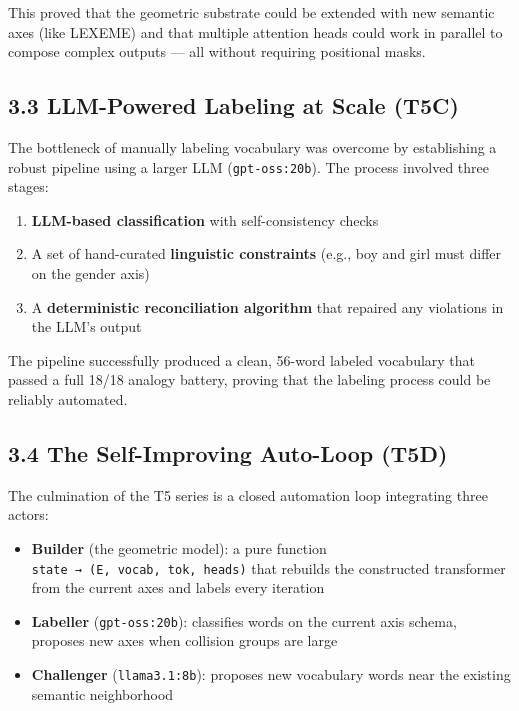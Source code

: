 \documentclass[
  twocolumn,
  10pt,
  a4paper]{article}
\providecommand{\tightlist}{%
  \setlength{\itemsep}{0pt}\setlength{\parskip}{0pt}}
\begin{document}
This proved that the geometric substrate could be extended with new
semantic axes (like LEXEME) and that multiple attention heads could work
in parallel to compose complex outputs --- all without requiring
positional masks.

\hypertarget{llm-powered-labeling-at-scale-t5c}{%
\subsection{3.3 LLM-Powered Labeling at Scale
(T5C)}\label{llm-powered-labeling-at-scale-t5c}}

The bottleneck of manually labeling vocabulary was overcome by
establishing a robust pipeline using a larger LLM
(\texttt{gpt-oss:20b}). The process involved three stages:

\begin{enumerate}
\def\labelenumi{\arabic{enumi}.}
\tightlist
\item
  \textbf{LLM-based classification} with self-consistency checks
\item
  A set of hand-curated \textbf{linguistic constraints} (e.g., boy and
  girl must differ on the gender axis)
\item
  A \textbf{deterministic reconciliation algorithm} that repaired any
  violations in the LLM's output
\end{enumerate}

The pipeline successfully produced a clean, 56-word labeled vocabulary
that passed a full 18/18 analogy battery, proving that the labeling
process could be reliably automated.

\hypertarget{the-self-improving-auto-loop-t5d}{%
\subsection{3.4 The Self-Improving Auto-Loop
(T5D)}\label{the-self-improving-auto-loop-t5d}}

The culmination of the T5 series is a closed automation loop integrating
three actors:

\begin{itemize}
\tightlist
\item
  \textbf{Builder} (the geometric model): a pure function
  \texttt{state\ →\ (E,\ vocab,\ tok,\ heads)} that rebuilds the
  constructed transformer from the current axes and labels every
  iteration
\item
  \textbf{Labeller} (\texttt{gpt-oss:20b}): classifies words on the
  current axis schema, proposes new axes when collision groups are large
\item
  \textbf{Challenger} (\texttt{llama3.1:8b}): proposes new vocabulary
  words near the existing semantic neighborhood
\end{itemize}
\end{document}
